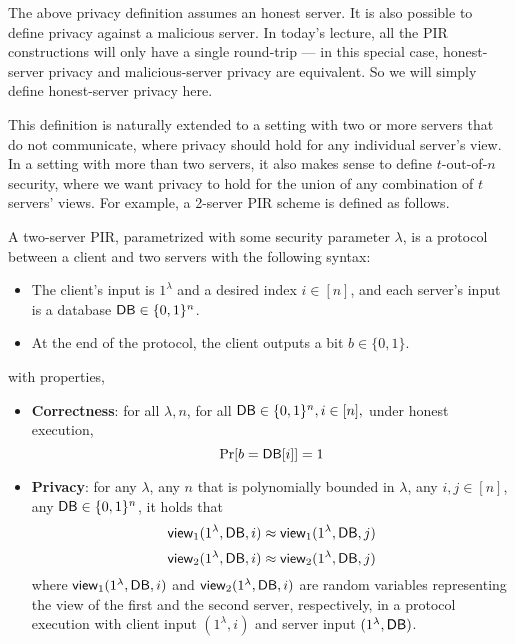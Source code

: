 \begin{remark}
The above privacy definition assumes an honest server.
It is also possible to define privacy against a malicious server.
In today's lecture, all the PIR constructions
will only have a single round-trip --- 
in this special case, honest-server privacy
and malicious-server
privacy are equivalent. So we will simply define honest-server privacy here.
\end{remark}



This definition is naturally extended to 
a setting with two or more servers that do not communicate, 
where privacy should hold for any individual server's view. 
In a setting with more than two servers, it also makes
sense to define $t$-out-of-$n$ security, where
we want privacy to hold for 
the union of any combination of $t$ 
servers' views.
For example, a 2-server PIR scheme is defined as follows. 



\begin{definition}
A two-server PIR, parametrized with some security parameter $\lambda$, is a 
protocol between a client and two servers %
with the following syntax:  
\begin{itemize}
	\item 
The client's input is $1^\lambda$ and a 
desired index $i \in [n]$, and 
each server's input is a database ${\sf DB} \in \{0,1\}^n$.
	\item At the end of the protocol, 
the client outputs a bit $b \in \{0,1\}$.
\end{itemize}
with properties,
\begin{itemize}
	\item \textbf{Correctness}: for all $\lambda, n$, for 
all ${\sf DB} \in \{0,1\}^n, i \in [n],$ under honest execution, 
	\[\Pr[b = \DB[i]] = 1%
\]
\item \textbf{Privacy}: 
for any $\lambda$, any $n$ that is polynomially bounded in $\lambda$,
any $i,j \in [n]$, any ${\sf DB}  \in \{0,1\}^n$, it holds that 
	\[{\sf view}_{{1}}(1^\lambda,{\sf DB},i) \approx {\sf view}_{{1}}(1^\lambda,{\sf DB},j)\]
	\[{\sf view}_{{2}}(1^\lambda,{\sf DB},i) \approx {\sf view}_{{2}}(1^\lambda,{\sf DB},j)\]
where ${\sf view}_{{1}}(1^\lambda, {\sf DB}, i)$
and ${\sf view}_{{2}}(1^\lambda, {\sf DB}, i)$
are random variables representing the 
view of the first and the second server, respectively, in a protocol
execution 
with client input $(1^\lambda, i)$
and server input $(1^\lambda, {\sf DB})$.
\end{itemize}
\end{definition}


